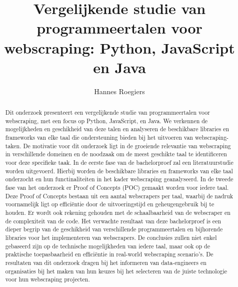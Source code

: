 \documentclass{hogent-article}
\title{Vergelijkende studie van programmeertalen voor webscraping: Python, JavaScript en Java}
\author{Hannes Roegiers}
\begin{document}
\begin{abstract}
  Dit onderzoek presenteert een vergelijkende studie van programmeertalen voor webscraping, met een focus op Python, JavaScript, en Java. 
  We verkennen de mogelijkheden en geschikheid van deze talen en analyseren de beschikbare libraries en frameworks van elke taal 
  die ondersteuning bieden bij het uitvoeren van webscraping-taken. 
  De motivatie voor dit onderzoek ligt in de groeiende relevantie van webscraping in verschillende domeinen en de noodzaak om de meest 
  geschikte taal te identificeren voor deze specifieke taak.
  In de eerste fase van de bachelorproef zal een literatuurstudie worden uitgevoerd. Hierbij worden de beschikbare libraries en frameworks van elke
  taal onderzocht en hun functinaliteiten in het kader webscraping geanalyseerd.
  In de tweede fase van het onderzoek er Proof of Concepts (POC) gemaakt worden voor iedere taal. Deze Proof of Concepts bestaan
  uit een aantal webscrapers per taal, waarbij de nadruk voornamelijk ligt op efficiëntie door de uitvoeringstijd en geheugengebruik 
  bij te houden. Er wordt ook rekening gehouden met de schaalbaarheid van de webscraper en de complexiteit van de code.
  Het verwachte resultaat van deze bachelorproef is een dieper begrip van de geschikheid van verschillende programmeertalen en bijhorende
  libraries voor het implementeren van webscrapers. 
  De conclusies zullen niet enkel gebaseerd zijn op de technische mogelijkheden
  van iedere taal, maar ook op de praktische toepasbaarheid en efficiëntie in real-world webscraping scenario's. De resultaten van 
  dit onderzoek dragen bij het informeren van data-engineers en organisaties bij het maken van hun keuzes bij het selecteren van 
  de juiste technologie voor hun webscraping projecten.
\end{abstract}

\tableofcontents



\printbibliography[heading=bibintoc]
\end{document}
